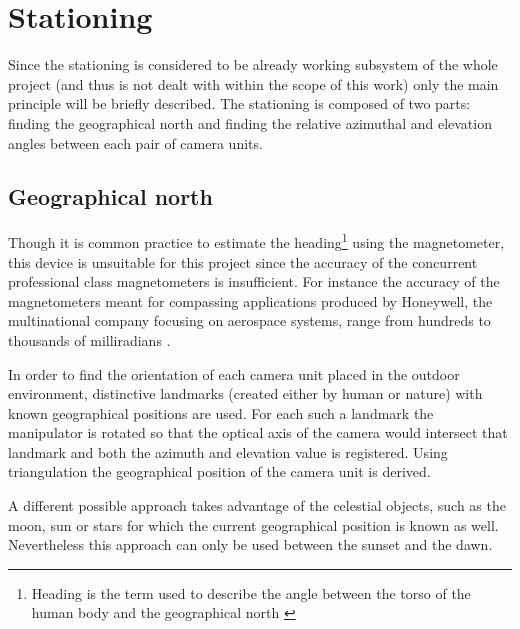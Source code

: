 \section{Stationing}

Since the stationing is considered to be already working subsystem of the whole project (and thus is not dealt with within the scope of this work) only the main principle will be briefly described. The stationing is composed of two parts: finding the geographical north and finding the relative azimuthal and elevation angles between each pair of camera units.

\subsection{Geographical north} \label{txt:geographical_north}

Though it is common practice to estimate the heading\footnote{Heading is the term used to describe the angle between the torso of the human body and the geographical north \cite{Henriksson648760}} using the magnetometer, this device is unsuitable for this project since the accuracy of the concurrent professional class magnetometers is insufficient. For instance the accuracy of the magnetometers meant for compassing applications produced by Honeywell, the multinational company focusing on aerospace systems, range from hundreds to thousands of milliradians \cite{Honeywell:compassing_catalog}.

In order to find the orientation of each camera unit placed in the outdoor environment, distinctive landmarks (created either by human or nature) with known geographical positions are used. For each such a landmark the manipulator is rotated so that the optical axis of the camera would intersect that landmark and both the azimuth and elevation value is registered. Using triangulation the geographical position of the camera unit is derived. 

A different possible approach takes advantage of the celestial objects, such as the moon, sun or stars for which the current geographical position is known as well. Nevertheless this approach can only be used between the sunset and the dawn.

